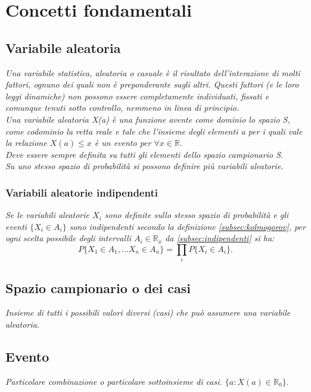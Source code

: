 \chapter{Concetti fondamentali} %
\section{Variabile aleatoria} %
\label{sec:variabile-aleatoria}
\emph{Una variabile statistica, aleatoria o casuale è il risultato dell'interazione di molti fattori, ognuno dei quali non è preponderante sugli altri. Questi fattori (e le loro leggi dinamiche) non possono essere completamente individuati, fissati e comunque tenuti sotto controllo, nemmeno in linea di principio. \\ Una variabile aleatoria X(a) è una funzione avente come dominio lo spazio S, come codominio la retta reale e tale che l'insieme degli elementi a per i quali vale la relazione $X(a)\le x$ è un evento per $\forall x \in \mathbb{R}.$ \\ Deve essere sempre definita su tutti gli elementi dello spazio campionario S. \\ Su uno stesso spazio di probabilità si possono definire più variabili aleatorie.}

\subsection{Variabili aleatorie indipendenti} %
\label{subsec:var-indipendenti}
\emph{Se le variabili aleatorie $X_{i}$ sono definite sullo stesso spazio di probabilità e gli eventi $\{ { X }_{ i }\in { A }_{ i }\} $ sono indipendenti secondo la definizione \ref{subsec:kolmogorov}, per ogni scelta possibile degli intervalli $A_{i} \in \mathbb{R}_{x}$ da \ref{subsec:indipendenti} si ha:
\[
P\{ { X }_{ 1 }\in { A }_{ 1 },\dots { X }_{ n }\in { A }_{ n }\} =\prod _{ i }{ P\{ { X }_{ i }\in { A }_{ i }\}  .} 
\]}

\section{Spazio campionario o dei casi} %
\label{sec:spazio-campionario}
\emph{Insieme di tutti i possibili valori diversi (casi) che può assumere una variabile aleatoria.}

\section{Evento} %
\label{sec:evento}
\emph{Particolare combinazione o particolare sottoinsieme di casi. $\{ a: X(a)\in { \mathbb{R} }_{ 0 }\}. $}
